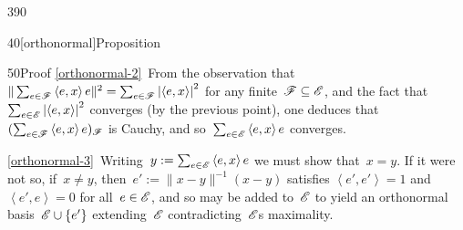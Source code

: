 \begin{parsec}{390}
\begin{point}{40}[orthonormal]{Proposition}
\begin{point}{50}{Proof}
\ref{orthonormal-2}\ 
From the observation
that~$\|\sum_{e\in\mathscr{F}} \left<e,x\right>e\|^2
= \sum_{e\in \mathscr{F}} \left|\left<e,x\right>\right|^2$
for any finite~$\mathscr{F}\subseteq \mathscr{E}$,
and the fact that~$\sum_{e\in \mathscr{E}} \left|\left<e,x\right>\right|^2$
converges (by the previous point),
one deduces that~$(\sum_{e\in\mathscr{F}} \left<e,x\right>e)_{\mathscr{F}}$
is Cauchy,
and so~$\sum_{e\in\mathscr{E}} \left<e,x\right>e$
converges.

\ref{orthonormal-3}\
Writing~$y:=\sum_{e\in\mathscr{E}} \left<e,x\right>e$ we must show that~$x=y$.
If it were not so,
if~$x\neq y$,
then~$e':=\|x-y\|^{-1}(x-y)$
satisfies
$\left<e',e'\right>=1$
and
$\left<e',e\right>=0$
for all~$e\in\mathscr{E}$,
and so may be added to~$\mathscr{E}$
to yield an orthonormal basis~$\mathscr{E}\cup\{e'\}$
extending~$\mathscr{E}$
contradicting~$\mathscr{E}$s  maximality.


\end{point}
\end{point}
\end{parsec}
